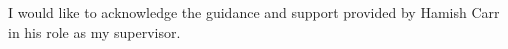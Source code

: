 I would like to acknowledge the guidance and support provided by Hamish Carr in his role as my supervisor.
